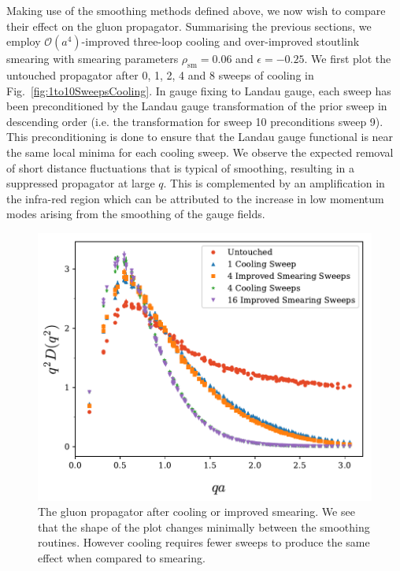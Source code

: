 Making use of the smoothing methods defined above, we now wish to compare their effect on the gluon propagator. Summarising the previous sections, we employ $\mathcal{O}(a^4)$-improved three-loop cooling and over-improved stoutlink smearing with smearing parameters $\rho_\text{sm}=0.06$ and $\epsilon=-0.25$. We first plot the untouched propagator after 0, 1, 2, 4 and 8 sweeps of cooling in Fig.~\ref{fig:1to10SweepsCooling}. In gauge fixing to Landau gauge, each sweep has been preconditioned by the Landau gauge transformation of the prior sweep in descending order (i.e. the transformation for sweep 10 preconditions sweep 9). This preconditioning is done to ensure that the Landau gauge functional is near the same local minima for each cooling sweep. We observe the expected removal of short distance fluctuations that is typical of smoothing, resulting in a suppressed propagator at large $q$. This is complemented by an amplification in the infra-red region which can be attributed to the increase in low momentum modes arising from the smoothing of the gauge fields.\\
%
\begin{figure}[tb]
\centering
\includegraphics[width=\linewidth]{./ScalarGluComp_q2_SmearCoolComp.pdf}
\caption{\label{fig:SmearCoolComp}The gluon propagator after cooling or improved smearing. We see that the shape of the plot changes minimally between the smoothing routines. However cooling requires fewer sweeps to produce the same effect when compared to smearing.}
\end{figure}
%

